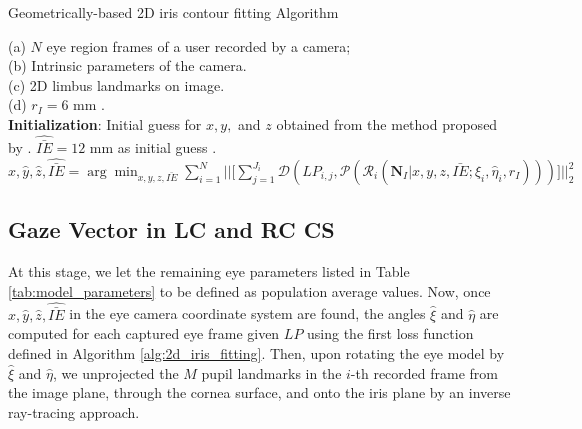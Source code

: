 \documentclass{article}
\begin{document}
\begin{algorithm}
    \caption{Geometrically-based 2D iris contour fitting Algorithm}
\begin{algorithmic}
    \REQUIRE (a) $N$ eye region frames of a user recorded by a camera; \\
    \STATE (b) Intrinsic parameters of the camera.\\
    \STATE (c) 2D limbus landmarks on image.\\
    \STATE (d) $r_I = 6$ mm \citep{Gross2008}.\\
    \STATE \textbf{Initialization}: Initial guess for $x,y,$ and $z$ obtained from the method proposed by \cite{SwirskiDodgson2013}. $\hat{\bar{IE}} = 12$ mm as initial guess \citep{Gross2008} .
    \ENDFOR
       \STATE $\hat{x}, \hat{y}, \hat{z}, \hat{\bar{IE}} = \arg \min_{x,y,z,\bar{IE}} \sum_{i=1}^{N}\biggl|\biggl| \biggl[ \sum_{j=1}^{J_i} \mathcal{D}(LP_{i,j}, \mathcal{P}(\mathcal{R}_i(\textbf{N}_I| x, y, z, \bar{IE}; \hat{\xi}_i, \hat{\eta}_i, r_I))) \biggr] \biggr|\biggr|_2^2$
    \ENDWHILE
\end{algorithmic}
\label{alg:2d_iris_fitting}
\end{algorithm}
 

\subsection{Gaze Vector in LC and RC CS} 

At this stage, we let the remaining eye parameters listed in Table \ref{tab:model_parameters} to be defined as population average values. Now, once $\hat{x}, \hat{y}, \hat{z}, \hat{\bar{IE}}$ in the eye camera coordinate system are found, the angles $\hat{\xi}$ and $\hat{\eta}$ are computed for each captured eye frame given $LP$ using the first loss function defined in Algorithm \ref{alg:2d_iris_fitting}.  Then, upon rotating the eye model by $\hat{\xi}$ and $\hat{\eta}$, we unprojected the $M$ pupil landmarks in the $i$-th recorded frame from the image plane,  through the cornea surface, and onto the iris plane  by an inverse ray-tracing approach. 
\end{document}
